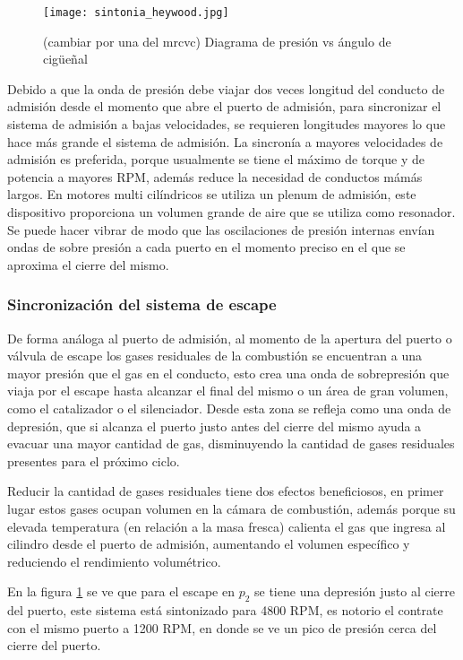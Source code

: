 \begin{figure}
    \centering
    \texttt{[image: sintonia\_heywood.jpg]}
    \caption{(cambiar por una del mrcvc) Diagrama de presión vs ángulo de cigüeñal}\label{fig:sintonia1}
\end{figure}

Debido a que la onda de presión debe viajar dos veces longitud del conducto de
admisión desde el momento que abre el puerto de admisión, para sincronizar el
sistema de admisión a bajas velocidades, se requieren longitudes mayores lo que
hace más grande el sistema de admisión.
%
La sincronía a mayores velocidades de admisión es preferida, porque usualmente
se tiene el máximo de torque y de potencia a mayores RPM, además reduce la
necesidad de conductos mámás largos.
%
En motores multi cilíndricos se utiliza un plenum de admisión, este dispositivo
proporciona un volumen grande de aire que se utiliza como resonador.
%
Se puede hacer vibrar de modo que las oscilaciones de presión internas envían
ondas de sobre presión a cada puerto en el momento preciso en el que se
aproxima el cierre del mismo.


\subsubsection{Sincronización del sistema de escape}

De forma análoga al puerto de admisión, al momento de la apertura del puerto o
válvula de escape los gases residuales de la combustión se encuentran a una
mayor presión que el gas en el conducto, esto crea una onda de sobrepresión que
viaja por el escape hasta alcanzar el final del mismo o un área de gran
volumen, como el catalizador o el silenciador.
%
Desde esta zona se refleja como una onda de depresión, que si alcanza el puerto
justo antes del cierre del mismo ayuda a evacuar una mayor cantidad de gas,
disminuyendo la cantidad de gases residuales presentes para el próximo ciclo.

Reducir la cantidad de gases residuales tiene dos efectos beneficiosos, en
primer lugar estos gases ocupan volumen en la cámara de combustión, además
porque su elevada temperatura (en relación a la masa fresca) calienta el gas
que ingresa al cilindro desde el puerto de admisión, aumentando el volumen
específico y reduciendo el rendimiento volumétrico.

En la figura \ref{fig:sintonia1} se ve que para el escape en $p_2$ se tiene una
depresión justo al cierre del puerto, este sistema está sintonizado para 4800
RPM, es notorio el contrate con el mismo puerto a 1200 RPM, en donde se ve un
pico de presión cerca del cierre del puerto.

